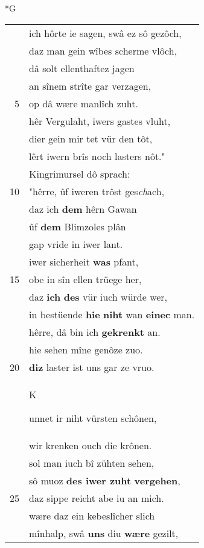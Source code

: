 \documentclass[8pt,a4paper,notitlepage]{article}
\begin{document}
\newpage
\begin{table}[ht]
\begin{minipage}[t]{0.5\linewidth}
\small
\begin{center}*G
\end{center}
\begin{tabular}{rl}
 & ich hôrte ie sagen, swâ ez sô gezôch,\\ 
 & daz man gein wîbes scherme vlôch,\\ 
 & dâ solt ellenthaftez jagen\\ 
 & an sînem strîte gar verzagen,\\ 
5 & op dâ wære manlîch zuht.\\ 
 & hêr Vergulaht, iwers gastes vluht,\\ 
 & dier gein mir tet vür den tôt,\\ 
 & lêrt iwern brîs noch lasters nôt."\\ 
 & Kingrimursel dô sprach:\\ 
10 & "hêrre, ûf iweren trôst ges\textit{ch}ach,\\ 
 & daz ich \textbf{dem} hêrn Gawan\\ 
 & ûf \textbf{dem} Blimzoles plân\\ 
 & gap vride in iwer lant.\\ 
 & iwer sicherheit \textbf{was} pfant,\\ 
15 & obe in sîn ellen trüege her,\\ 
 & daz \textbf{ich} \textbf{des} vür iuch würde wer,\\ 
 & in bestüende \textbf{hie} \textbf{niht} wan \textbf{einec} man.\\ 
 & hêrre, dâ bin ich \textbf{gekrenkt} an.\\ 
 & hie sehen mîne genôze zuo.\\ 
20 & \textbf{diz} laster ist uns gar ze vruo.\\ 
 & \begin{large}K\end{large}unnet ir niht vürsten schônen,\\ 
 & wir krenken ouch die krônen.\\ 
 & sol man iuch bî zühten sehen,\\ 
 & sô muoz \textbf{des iwer zuht} \textbf{vergehen},\\ 
25 & daz sippe reicht abe iu an mich.\\ 
 & wære daz ein kebeslîcher slich\\ 
 & mînhalp, swâ \textbf{uns} diu \textbf{wære} gezilt,\\ 

\end{tabular}
\end{minipage}
\end{table}
\end{document}
